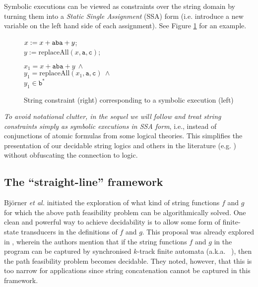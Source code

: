 Symbolic executions can be viewed as constraints over the 
string domain by turning them
into a \emph{Static Single Assignment} (SSA) form (i.e. introduce a new 
variable 
on the left hand side of each assignment). See Figure \ref{fig:SSA} for an
example.
\begin{figure}
    \qquad
    \begin{minipage}{.49\linewidth}
        $x := x + \text{\texttt{aba}} + y$;\\
        $y := \text{replaceAll}(x,\texttt{a},\texttt{c})$;\\
    \end{minipage}
    \quad
    \begin{minipage}{.49\linewidth}
        $x_1 = x + \texttt{aba} + y\ \wedge$ \\
        $y_1 = \text{replaceAll}(x_1,\texttt{a},\texttt{c})\ \wedge$ \\
        $y_1 \in \texttt{b}^*$
    \end{minipage}
    \caption{String constraint (right) corresponding to a symbolic execution
    (left)
    \label{fig:SSA}}
\end{figure}

\emph{To avoid notational clutter, in the sequel we will follow \cite{BTV09}
and treat string 
constraints simply as symbolic executions in SSA form}, i.e., instead of 
conjunctions of atomic formulas from some logical theories. 
This simplifies 
the presentation of our decidable string logics and others in the literature 
(e.g. \cite{LB16,CCHLW18}) without obfuscating the connection to logic.


\subsection{The ``straight-line'' framework}
Bj\"{o}rner \emph{et al.} \cite{BTV09} initiated the exploration
of what kind of string functions $f$ and $g$ for which the above path 
feasibility problem can be algorithmically solved. 
One clean and powerful way to achieve decidability is to 
allow some form of finite-state transducers in the definitions of $f$
and $g$.
%
This proposal was already explored in \cite{BTV09}, wherein the authors mention
that
%
if the string functions $f$ and $g$ in the program can be captured by 
synchronised $k$-track finite automata (a.k.a.~ 
\cite{BG04}), then
the path feasibility problem becomes decidable. They noted, however, that
this is too narrow for applications since string concatenation cannot be
captured in this framework. 


